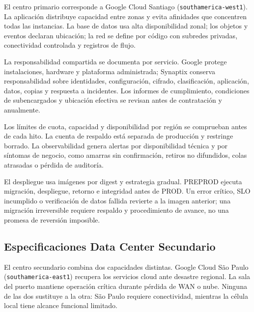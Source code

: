 \documentclass[11pt,letterpaper]{report}
\begin{document}
El centro primario corresponde a Google Cloud Santiago (\texttt{southamerica-west1}). La aplicación distribuye capacidad entre zonas y evita afinidades que concentren todas las instancias. La base de datos usa alta disponibilidad zonal; los objetos y eventos declaran ubicación; la red se define por código con subredes privadas, conectividad controlada y registros de flujo.

La responsabilidad compartida se documenta por servicio. Google protege instalaciones, hardware y plataforma administrada; Synaptix conserva responsabilidad sobre identidades, configuración, cifrado, clasificación, aplicación, datos, copias y respuesta a incidentes. Los informes de cumplimiento, condiciones de subencargados y ubicación efectiva se revisan antes de contratación y anualmente.

Los límites de cuota, capacidad y disponibilidad por región se comprueban antes de cada hito. La cuenta de respaldo está separada de producción y restringe borrado. La observabilidad genera alertas por disponibilidad técnica y por síntomas de negocio, como amarras sin confirmación, retiros no difundidos, colas atrasadas o pérdida de auditoría.

El despliegue usa imágenes por digest y estrategia gradual. PREPROD ejecuta migración, despliegue, retorno e integridad antes de PROD. Un error crítico, SLO incumplido o verificación de datos fallida revierte a la imagen anterior; una migración irreversible requiere respaldo y procedimiento de avance, no una promesa de reversión imposible.

\subsection{Especificaciones Data Center Secundario}

El centro secundario combina dos capacidades distintas. Google Cloud São Paulo (\texttt{southamerica-east1}) recupera los servicios cloud ante desastre regional. La sala del puerto mantiene operación crítica durante pérdida de WAN o nube. Ninguna de las dos sustituye a la otra: São Paulo requiere conectividad, mientras la célula local tiene alcance funcional limitado.
\end{document}

